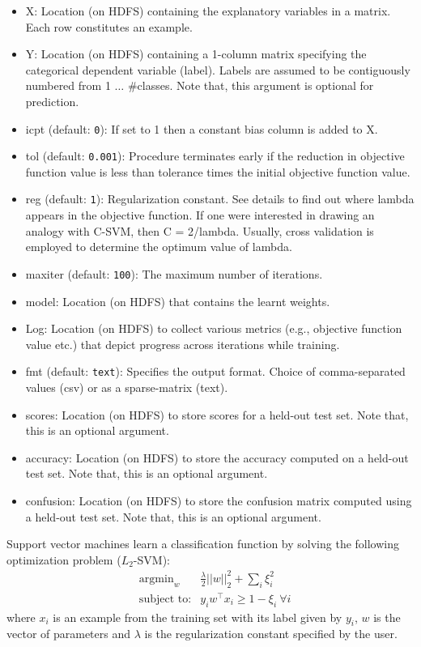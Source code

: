 
\begin{itemize}
\item X: Location (on HDFS) containing the explanatory variables 
in a matrix. Each row constitutes an example.
\item Y: Location (on HDFS) containing a 1-column matrix specifying 
the categorical dependent variable (label). Labels are assumed to be 
contiguously numbered from 1 $\ldots$ \#classes.  Note that, this 
argument is optional for prediction.
\item icpt (default: {\tt 0}): If set to 1 then a constant bias column
is added to X.
\item tol (default: {\tt 0.001}): Procedure terminates early if the reduction
in objective function value is less than tolerance times the initial objective
function value.
\item reg (default: {\tt 1}): Regularization constant. See details to find 
out where lambda appears in the objective function. If one were interested 
in drawing an analogy with C-SVM, then C = 2/lambda. Usually, cross validation 
is employed to determine the optimum value of lambda.
\item maxiter (default: {\tt 100}): The maximum number of iterations.
\item model: Location (on HDFS) that contains the learnt weights.
\item Log: Location (on HDFS) to collect various metrics (e.g., objective 
function value etc.) that depict progress across iterations while training.
\item fmt (default: {\tt text}): Specifies the output format. Choice of 
comma-separated values (csv) or as a sparse-matrix (text).
\item scores: Location (on HDFS) to store scores for a held-out test set.
Note that, this is an optional argument.
\item accuracy: Location (on HDFS) to store the accuracy computed on a
held-out test set. Note that, this is an optional argument.
\item confusion: Location (on HDFS) to store the confusion matrix
computed using a held-out test set. Note that, this is an optional 
argument.
\end{itemize}


Support vector machines learn a classification function by solving the
following optimization problem ($L_2$-SVM):
\begin{eqnarray*}
&\textrm{argmin}_w& \frac{\lambda}{2} ||w||_2^2 + \sum_i \xi_i^2\\
&\textrm{subject to:}& y_i w^{\top} x_i \geq 1 - \xi_i ~ \forall i
\end{eqnarray*}
where $x_i$ is an example from the training set with its label given by $y_i$, 
$w$ is the vector of parameters and $\lambda$ is the regularization constant 
specified by the user.

